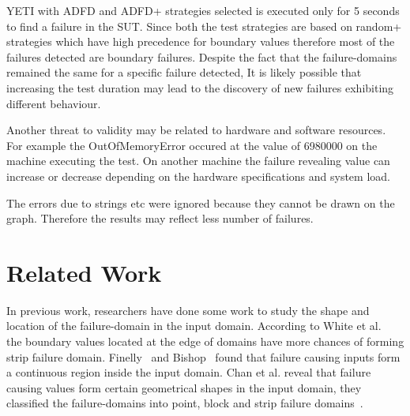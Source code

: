 \documentclass[runningheads,a4paper]{llncs}
\begin{document}
YETI with ADFD and ADFD+ strategies selected is executed only for 5 seconds to find a failure in the SUT. Since both the test strategies are based on random+ strategies which have high precedence for boundary values therefore most of the failures detected are boundary failures. Despite the fact that the failure-domains remained the same for a specific failure detected, It is likely possible that increasing the test duration may lead to the discovery of new failures exhibiting different behaviour.

Another threat to validity may be related to hardware and software resources. For example the OutOfMemoryError occured at the value of 6980000 on the machine executing the test. On another machine the failure revealing value can increase or decrease depending on the hardware specifications and system load.

The errors due to strings etc were ignored because they cannot be drawn on the graph. Therefore the results may reflect less number of failures.












\section{Related Work}
In previous work, researchers have done some work to study the shape and location of the failure-domain in the input domain. According to White et al.~\cite{white1980domain} the boundary values located at the edge of domains have more chances of forming strip failure domain. Finelly~\cite{finelli1991nasa} and Bishop~\cite{bishop1993variation} found that failure causing inputs form a continuous region inside the input domain. Chan et al. reveal that failure causing values form certain geometrical shapes in the input domain, they classified the failure-domains into point, block and strip failure domains~\cite{chan1996proportional}. 
\end{document}

